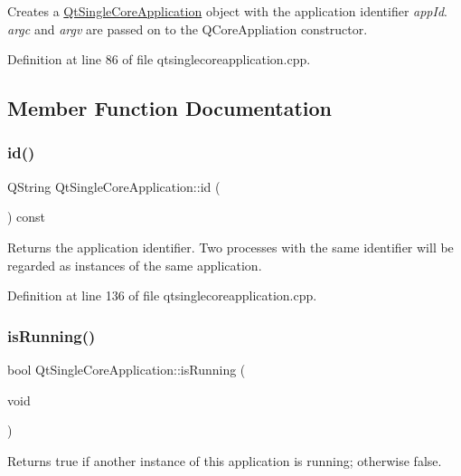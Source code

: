 Creates a \hyperlink{class_qt_single_core_application}{Qt\+Single\+Core\+Application} object with the application identifier {\itshape app\+Id}. {\itshape argc} and {\itshape argv} are passed on to the Q\+Core\+Appliation constructor. 

Definition at line 86 of file qtsinglecoreapplication.\+cpp.



\subsection{Member Function Documentation}
\mbox{\label{class_qt_single_core_application_ac49e5d009f1f40f17168b89801afe152}} 
\subsubsection{\texorpdfstring{id()}{id()}}
{\footnotesize\ttfamily Q\+String Qt\+Single\+Core\+Application\+::id (\begin{DoxyParamCaption}{ }\end{DoxyParamCaption}) const}

Returns the application identifier. Two processes with the same identifier will be regarded as instances of the same application. 

Definition at line 136 of file qtsinglecoreapplication.\+cpp.

\mbox{\label{class_qt_single_core_application_a419bfb7b02f0459f4d207d448bc6c876}} 
\subsubsection{\texorpdfstring{is\+Running()}{isRunning()}}
{\footnotesize\ttfamily bool Qt\+Single\+Core\+Application\+::is\+Running (\begin{DoxyParamCaption}\item[{void}]{ }\end{DoxyParamCaption})}

Returns true if another instance of this application is running; otherwise false.

